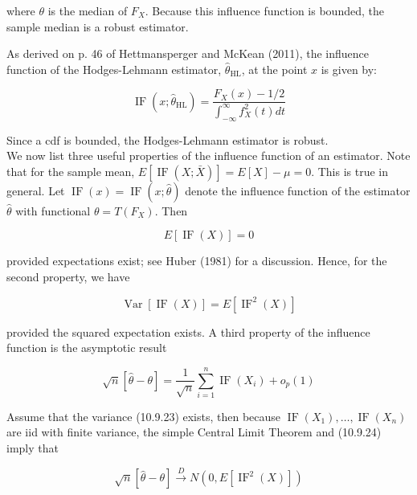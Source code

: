 where $\theta$ is the median of $F_{X}$. Because this influence function is bounded, the sample median is a robust estimator.

As derived on p. 46 of Hettmansperger and McKean (2011), the influence function of the Hodges-Lehmann estimator, $\widehat{\theta}_{\mathrm{HL}}$, at the point $x$ is given by:


\begin{equation*}
\operatorname{IF}\left(x ; \widehat{\theta}_{\mathrm{HL}}\right)=\frac{F_{X}(x)-1 / 2}{\int_{-\infty}^{\infty} f_{X}^{2}(t) d t} \tag{10.9.21}
\end{equation*}


Since a cdf is bounded, the Hodges-Lehmann estimator is robust.\\
We now list three useful properties of the influence function of an estimator. Note that for the sample mean, $E[\operatorname{IF}(X ; \bar{X})]=E[X]-\mu=0$. This is true in general. Let $\operatorname{IF}(x)=\operatorname{IF}(x ; \widehat{\theta})$ denote the influence function of the estimator $\widehat{\theta}$ with functional $\theta=T\left(F_{X}\right)$. Then


\begin{equation*}
E[\operatorname{IF}(X)]=0 \tag{10.9.22}
\end{equation*}


provided expectations exist; see Huber (1981) for a discussion. Hence, for the second property, we have


\begin{equation*}
\operatorname{Var}[\operatorname{IF}(X)]=E\left[\operatorname{IF}^{2}(X)\right] \tag{10.9.23}
\end{equation*}


provided the squared expectation exists. A third property of the influence function is the asymptotic result


\begin{equation*}
\sqrt{n}[\widehat{\theta}-\theta]=\frac{1}{\sqrt{n}} \sum_{i=1}^{n} \operatorname{IF}\left(X_{i}\right)+o_{p}(1) \tag{10.9.24}
\end{equation*}


Assume that the variance (10.9.23) exists, then because $\operatorname{IF}\left(X_{1}\right), \ldots, \operatorname{IF}\left(X_{n}\right)$ are iid with finite variance, the simple Central Limit Theorem and (10.9.24) imply that


\begin{equation*}
\sqrt{n}[\widehat{\theta}-\theta] \xrightarrow{D} N\left(0, E\left[\operatorname{IF}^{2}(X)\right]\right) \tag{10.9.25}
\end{equation*}


